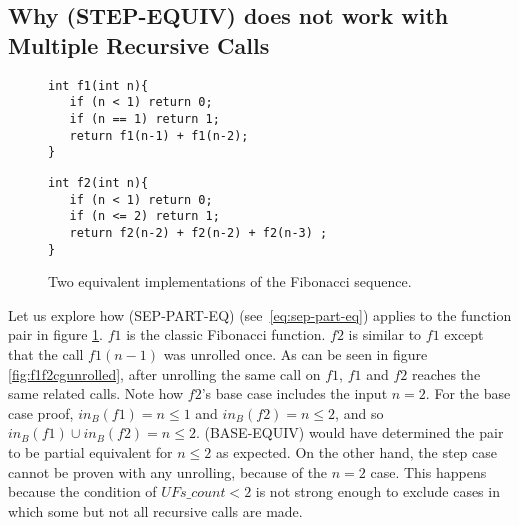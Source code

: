 \subsection{Why (STEP-EQUIV) does not work with Multiple Recursive Calls}
\label{sec:appstepmrc}
\begin{figure}[h]
\begin{center}
\begin{minipage}{7 cm}
\begin{lstlisting}
int f1(int n){
   if (n < 1) return 0;
   if (n == 1) return 1; 
   return f1(n-1) + f1(n-2);
}
\end{lstlisting}
\end{minipage}
\begin{minipage}{7 cm}
\begin{lstlisting}
int f2(int n){
   if (n < 1) return 0;
   if (n <= 2) return 1;
   return f2(n-2) + f2(n-2) + f2(n-3) ;
}
\end{lstlisting}
\end{minipage}
\caption{Two equivalent implementations of the Fibonacci sequence.}
\label{fig:f1f2}
\end{center}
\end{figure}
Let us explore how (SEP-PART-EQ) (see~\ref{eq:sep-part-eq}) applies to the function pair in figure \ref{fig:f1f2}.
$f1$ is the classic Fibonacci function. $f2$ is similar to $f1$ except that the call  $f1(n-1)$ was unrolled once. As can be seen in figure \ref{fig:f1f2cgunrolled}, after unrolling the same call on $f1$, $f1$ and $f2$ reaches the same related calls. Note how  $f2$'s base case includes the input $n=2$. 
For the base case proof, $in_B(f1) = {n \leq 1}$ and  $in_B(f2) = {n \leq 2}$, and so $in_B(f1) \cup in_B(f2) = {n \leq 2} $. (BASE-EQUIV) would have determined the pair to be partial equivalent for ${n \leq 2}$ as expected. On the other hand, the step case cannot be proven with any unrolling, because of the $n=2$ case. This happens because the condition of $UFs\_count < 2$ is not strong enough to exclude cases in which some but not all recursive calls are made.

